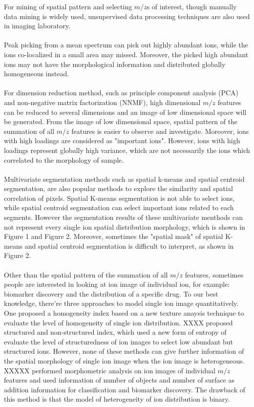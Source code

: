 \documentclass{bioinfo}
\begin{document}
For mining of spatial pattern and selecting $m/z$s of interest, though manually data mining is widely used, unsupervised data processing techniques are also used in imaging laboratory. \\
\\
Peak picking from a mean spectrum can pick out highly abundant ions, while the ions co-localized in a small area may missed. Moreover, the picked high abundant ions may not have the morphological information and distributed globally homogeneous instead.\\
\\
For dimension reduction method, such as principle component analysis (PCA) and non-negative matrix factorization (NNMF), high dimensional $m/z$ features can be reduced to several dimensions and an image of low dimensional space will be generated. From the image of low dimensional space, spatial pattern of the summation of all $m/z$ features is easier to observe and investigate. Moreover, ions with high loadings are considered as "important ions". However, ions with high loadings represent globally high variance, which are not necessarily the ions which correlated to the morphology of sample.\\
\\
Multivariate segmentation methods such as spatial k-means and spatial centroid segmentation, are also popular methods to explore the similarity and spatial correlation of pixels. Spatial K-means segmentation is not able to select ions, while spatial centroid segmentation can select important ions related to each segments. However the segmentation results of these multivariate menthods can not represent every single ion spatial distribution morphology, which is shown in Figure 1 and Figure 2. Moreover, sometimes the "spatial mask" of spatial K-means and spatial centroid segmentation is difficult to interpret, as shown in Figure 2.\\
\\  

Other than the spatial pattern of the summation of all $m/z$ features, sometimes people are interested in looking at ion image of individual ion, for example: biomarker discovery and the distribution of a specific drug. To our best knowledge, there're three approaches to model single ion image quantitatively. 
One proposed a homogeneity index based on a new texture anaysis technique to evaluate the level of homogeneity of single ion distribution.
XXXX proposed structured and non-structured index, which used a new form of entropy of evaluate the level of structuredness of ion images to select low abundant but structured ions.
However, none of these methods can give further information of  the spatial morphology of single ion image when the ion image is heterogeneous.
XXXXX performed morphometric analysis on ion images of individual $m/z$ features and used information of number of objects and number of surface as addition information for classification and biomarker discovery. The drawback of this method is that the model of heterogeneity of ion distribution is binary. \\
\end{document}
